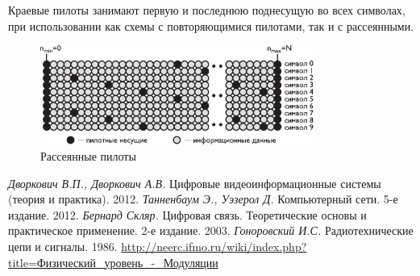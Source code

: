 Краевые пилоты занимают первую и последнюю поднесущую во всех символах, при использовании как схемы с повторяющимися пилотами, так и с рассеянными.

\begin{figure}[h]
\centering
\includegraphics[width = 0.8\textwidth]{pilots.pdf}
\caption{Рассеянные пилоты}
\label{pilots}
\end{figure}

\begin{thebibliography}{9}
     \textit{Дворкович В.П., Дворкович А.В.} Цифровые видеоинформационные системы (теория и практика). 2012.
     \textit{Танненбаум Э., Уэзерол Д.} Компьютерный сети. 5-е издание. 2012.
     \textit{Бернард Скляр.}
    Цифровая связь. Теоретические основы и практическое применение. 2-е издание. 2003.
     \textit{Гоноровский И.С.} Радиотехнические цепи и сигналы. 1986.
     \href{http://neerc.ifmo.ru/wiki/index.php?title=%D0%A4%D0%B8%D0%B7%D0%B8%D1%87%D0%B5%D1%81%D0%BA%D0%B8%D0%B9_%D1%83%D1%80%D0%BE%D0%B2%D0%B5%D0%BD%D1%8C_-_%D0%9C%D0%BE%D0%B4%D1%83%D0%BB%D1%8F%D1%86%D0%B8%D0%B8}{http://neerc.ifmo.ru/wiki/index.php?title=Физический\_уровень\_-\_Модуляции}
\end{thebibliography}




